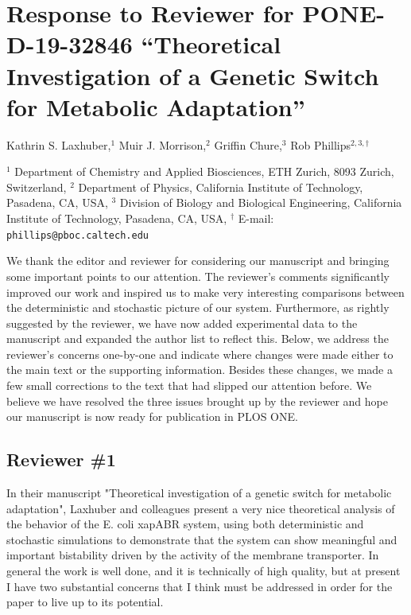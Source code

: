 \documentclass[11pt,letterpaper]{article}
\begin{document}
\section*{Response to Reviewer for PONE-D-19-32846 ``Theoretical Investigation of a Genetic Switch for Metabolic Adaptation''}
Kathrin S. Laxhuber,$^{1}$ Muir J. Morrison,$^{2}$ Griffin Chure,$^{3}$ Rob Phillips$^{2, 3, \dagger}$
\vspace{10pt}

\noindent\tiny{$^1$ Department of Chemistry and Applied Biosciences, ETH Zurich, 8093 Zurich, Switzerland,
$^2$ Department of Physics, California Institute of Technology, Pasadena, CA, USA,
$^3$ Division of Biology and Biological Engineering, California Institute of Technology, Pasadena, CA, USA, $^\dagger$ E-mail: \texttt{phillips@pboc.caltech.edu}}

\begin{responseSummary}
We thank the editor and reviewer for considering our manuscript and
bringing some important points to our attention. The reviewer's comments
significantly improved our work and inspired us to make very interesting
comparisons between the deterministic and stochastic picture of our
system. Furthermore, as rightly suggested by the reviewer, we have now
added experimental data to the manuscript and expanded the author list
to reflect this. Below, we address the reviewer's concerns one-by-one
and indicate where changes were made either to the main text or the
supporting information. Besides these changes, we made a few small
corrections to the text that had slipped our attention before. We
believe we have resolved the three issues brought up by the reviewer and
hope our manuscript is now ready for publication in PLOS ONE.
\end{responseSummary}

\subsection*{Reviewer \#1}
\begin{review}
In their manuscript "Theoretical investigation of a genetic switch for
metabolic adaptation", Laxhuber and colleagues present a very nice
theoretical analysis of the behavior of the E. coli xapABR system, using
both deterministic and stochastic simulations to demonstrate that the
system can show meaningful and important bistability driven by the
activity of the membrane transporter. In general the work is well done,
and it is technically of high quality, but at present I have two
substantial concerns that I think must be addressed in order for the
paper to live up to its potential.
\end{review}
\end{document}
